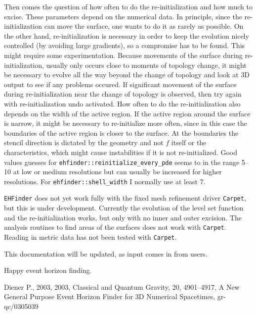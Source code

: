 Then comes the question of how often to do the re-initialization and how
much to excise. These parameters depend on the numerical data. In principle,
since the re-initialization can move the surface, one wants to do it as
rarely as possible. On the other hand, re-initialization is necessary
in order to keep the evolution nicely controlled (by avoiding large gradients),
so a compromise has to be found. This might require some experimentation.
Because movements of the surface during re-initialization, usually only
occurs close to moments of topology change, it might be necessary to evolve
all the way beyond the change of topology and look at 3D output to see if
any problems occured. If significant movement of the surface during
re-initialization near the change of topology is observed, then try again
with re-initialization undo activated. How often to do the re-initialization
also depends on the width of the active region. If the active region around
the surface is narrow, it might be necessary to re-initialize more often,
since in this case the boundaries of the active region is closer to the
surface. At the boundaries the stencil direction is dictated by the geometry
and not $f$ itself or the characteristics, which might cause instabilities
if it is not re-initialized. Good values guesses for
{\tt ehfinder::reinitialize\_every\_pde} seems to in the range 5--10 at
low or medium resolutions but can usually be increased for higher
resolutions. For {\tt ehfinder::shell\_width} I normally use at least 7.

{\tt EHFinder} does not yet work fully with the fixed mesh refinement driver
{\tt Carpet}, but this is under development. Currently the evolution of the
level set function and the re-initialization works, but only with no inner
and outer excision. The analysis routines to find areas of the surfaces does
not work with {\tt Carpet}. Reading in metric data has not been tested with
{\tt Carpet}.

This documentation will be updated, as input comes in from users.

Happy event horizon finding.

\begin{thebibliography}{9}

   {Diener P., 2003, 2003, Classical and Quantum Gravity, 20, 4901--4917,
    A New General Purpose Event Horizon Finder for 3D Numerical Spacetimes,
    gr-qc/0305039}
\end{thebibliography}

